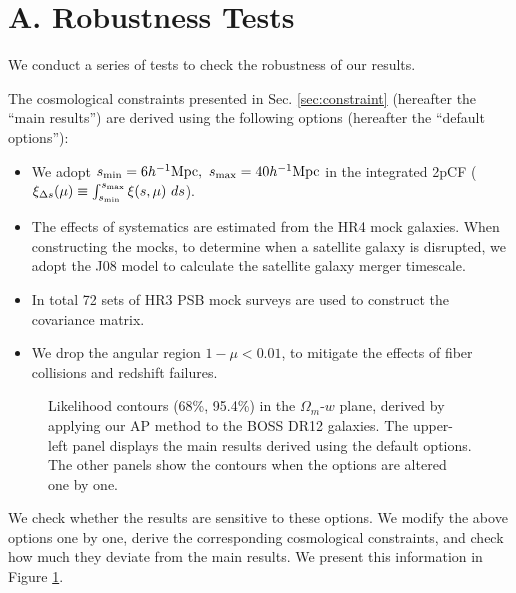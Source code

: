 \documentclass[iop]{emulateapj}
\begin{document}
\appendix

\section{A. Robustness Tests}\label{sec:RBtest}

We conduct a series of tests to check the robustness of our results.

The cosmological constraints presented in Sec. \ref{sec:constraint} (hereafter the ``main results'') are derived using 
the following options (hereafter the ``default options''):
\begin{itemize}
 \item We adopt $s_{\rm min}=6 h^{-1} {\rm Mpc},\ s_{\rm max}=40 h^{-1} {\rm Mpc}$ in the integrated 2pCF
 ($\xi_{\Delta s} (\mu) \equiv \int_{s_{\rm min}}^{s_{\rm max}} \xi (s,\mu)\ ds$).
 \item The effects of systematics are estimated from the HR4 mock galaxies. 
 When constructing the mocks, to determine when a satellite galaxy is disrupted,
 we adopt the J08 model to calculate the satellite galaxy merger timescale.
 \item In total 72 sets of HR3 PSB mock surveys are used to construct the covariance matrix.
 \item We drop the angular region $1 - \mu < 0.01$, to mitigate the effects of fiber collisions and redshift failures.
\end{itemize}


\begin{figure}
   \caption{ \label{fig_contour_RB}  
   Likelihood contours (68\%, 95.4\%) in the $\Omega_m$-$w$ plane, derived by applying our AP method to the BOSS DR12 galaxies.
   The upper-left panel displays the main results derived using the default options.
   The other panels show the contours when the options are altered one by one.
   }
\end{figure}

We check whether the results are sensitive to these options.
We modify the above options one by one, 
derive the corresponding cosmological constraints, 
and check how much they deviate from the main results.
We present this information in Figure \ref{fig_contour_RB}. %
\end{document}
